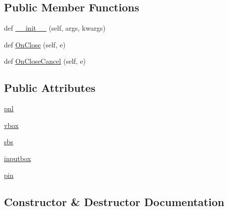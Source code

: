 \subsection*{Public Member Functions}
\begin{DoxyCompactItemize}
\item 
def \hyperlink{class_uni_dec_1_1unidec__modules_1_1isolated__packages_1_1twitter__interface_1_1_pin_window_a3751d5327fe018d8acf10966eee6e122}{\+\_\+\+\_\+init\+\_\+\+\_\+} (self, args, kwargs)
\item 
def \hyperlink{class_uni_dec_1_1unidec__modules_1_1isolated__packages_1_1twitter__interface_1_1_pin_window_ae5dd6f0761d8acfdaa69b74ac3038a13}{On\+Close} (self, e)
\item 
def \hyperlink{class_uni_dec_1_1unidec__modules_1_1isolated__packages_1_1twitter__interface_1_1_pin_window_a9a77fec931cf3339267b98776900c032}{On\+Close\+Cancel} (self, e)
\end{DoxyCompactItemize}
\subsection*{Public Attributes}
\begin{DoxyCompactItemize}
\item 
\hyperlink{class_uni_dec_1_1unidec__modules_1_1isolated__packages_1_1twitter__interface_1_1_pin_window_ad4879949ab25251a53b7b6ceb2fb8109}{pnl}
\item 
\hyperlink{class_uni_dec_1_1unidec__modules_1_1isolated__packages_1_1twitter__interface_1_1_pin_window_a2627bc2b7eff1c2be0889adf41bb79ca}{vbox}
\item 
\hyperlink{class_uni_dec_1_1unidec__modules_1_1isolated__packages_1_1twitter__interface_1_1_pin_window_a758e7e95fa12b676ba5a25ca1f153c25}{sbs}
\item 
\hyperlink{class_uni_dec_1_1unidec__modules_1_1isolated__packages_1_1twitter__interface_1_1_pin_window_a2f7254c1b45f690faffa9620ff87c5dc}{inputbox}
\item 
\hyperlink{class_uni_dec_1_1unidec__modules_1_1isolated__packages_1_1twitter__interface_1_1_pin_window_a1f3295774389dd2ffd3dcf55337bdac4}{pin}
\end{DoxyCompactItemize}


\subsection{Constructor \& Destructor Documentation}
\hypertarget{class_uni_dec_1_1unidec__modules_1_1isolated__packages_1_1twitter__interface_1_1_pin_window_a3751d5327fe018d8acf10966eee6e122}{}
